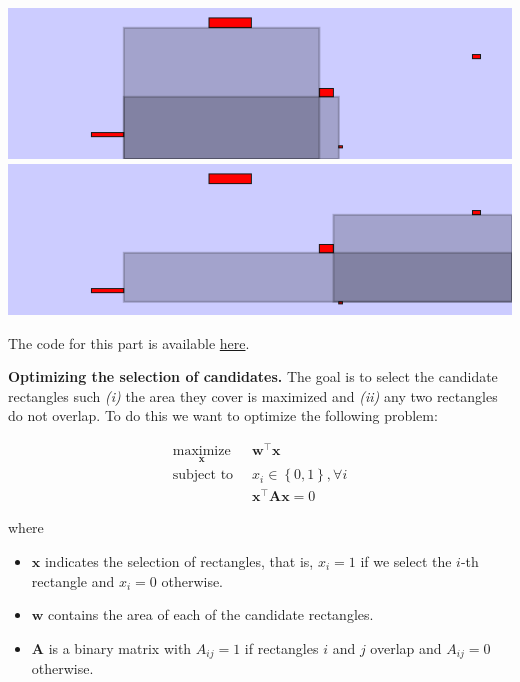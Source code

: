 \documentclass[
]{article}
\providecommand{\tightlist}{%
  \setlength{\itemsep}{0pt}\setlength{\parskip}{0pt}}
\begin{document}
\begin{itemize}
  \includegraphics{imgs/mers-3c.png} \includegraphics{imgs/mers-3d.png}
\end{itemize}

The code for this part is available
\href{https://bitbucket.org/doneata/optim-cut/src/master/candidates.py}{here}.

\textbf{Optimizing the selection of candidates.} The goal is to select
the candidate rectangles such \emph{(i)} the area they cover is
maximized and \emph{(ii)} any two rectangles do not overlap. To do this
we want to optimize the following problem:

\[
\begin{aligned}
\underset{\mathbf{x}}{\text{maximize}} \;\; & \mathbf{w}^\intercal\mathbf{x} \\
\text{subject to} \;\; &  x_i \in \left\{0, 1\right\}, \forall i \\
                       & \mathbf{x}^\intercal \mathbf{A} \mathbf{x} = 0
\end{aligned}
\]

where

\begin{itemize}
\tightlist
\item
  \(\mathbf{x}\) indicates the selection of rectangles, that is,
  \(x_i = 1\) if we select the \(i\)-th rectangle and \(x_i = 0\)
  otherwise.
\item
  \(\mathbf{w}\) contains the area of each of the candidate rectangles.
\item
  \(\mathbf{A}\) is a binary matrix with \(A_{ij} = 1\) if rectangles
  \(i\) and \(j\) overlap and \(A_{ij} = 0\) otherwise.
\end{itemize}
\end{document}
